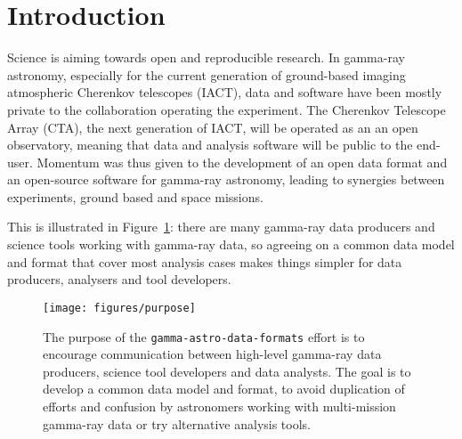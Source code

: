 \section{Introduction}

Science is aiming towards open and reproducible research. In gamma-ray astronomy, especially for the current generation of ground-based imaging atmospheric Cherenkov telescopes (IACT), data and software have been mostly private to the collaboration operating the experiment. The Cherenkov Telescope Array (CTA), the next generation of IACT, will be operated as an an open observatory, meaning that data and analysis software will be public to the end-user. Momentum was thus given to the development of an open data format and an open-source software for gamma-ray astronomy, leading to synergies between experiments, ground based and space missions.

This is illustrated in Figure~\ref{fig:purpose}: there are many gamma-ray data producers and science tools working with gamma-ray data, so agreeing on a common data model and format that cover most analysis cases makes things simpler for data producers, analysers and tool developers.

\begin{figure}[tb]
\centerline{\texttt{[image: figures/purpose]}}
\caption{
The purpose of the \texttt{gamma-astro-data-formats} effort is to encourage communication between high-level gamma-ray data producers, science tool developers and data analysts. The goal is to develop a common data model and format, 
to avoid duplication of efforts and confusion by astronomers working with multi-mission gamma-ray data or try alternative analysis tools.
}
\label{fig:purpose}
\end{figure}

